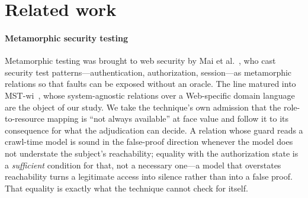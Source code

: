 \section{Related work}
\label{sec:related}

\paragraph{Metamorphic security testing} Metamorphic testing was brought to web
security by Mai et al.~\cite{Mai2019Metamorphic}, who cast security test
patterns---authentication, authorization, session---as metamorphic relations so that
faults can be exposed without an oracle. The line matured into
\mbox{MST-wi}~\cite{Chaleshtari2022Metamorphic}, whose \ResLitMrCatalog{}
system-agnostic relations over a Web-specific domain language are the object of our
study. We take the technique's own admission that the role-to-resource mapping is
``not always available'' at face value and follow it to its consequence for what the
adjudication can decide. A relation whose guard reads a crawl-time model is sound in
the false-proof direction whenever the model does not understate the subject's
reachability; equality with the authorization state is a \emph{sufficient} condition
for that, not a necessary one---a model that overstates reachability turns a
legitimate access into silence rather than into a false proof. That equality is
exactly what the technique cannot check for itself.


